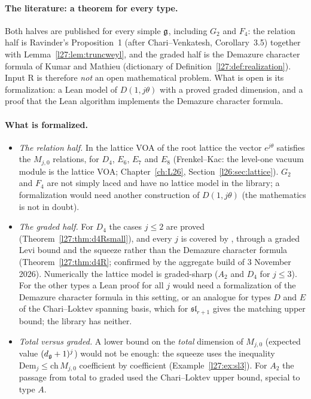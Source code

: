 \paragraph{The literature: a theorem for every type.} Both halves are published for every simple $\mathfrak g$, including $G_2$ and
$F_4$: the relation half is Ravinder's Proposition~1 (after Chari--Venkatesh, Corollary~3.5) together with Lemma~\ref{l27:lem:truncweyl},
and the graded half is the Demazure character formula of Kumar and Mathieu (dictionary of Definition~\ref{l27:def:realization}). Input R
is therefore \emph{not} an open mathematical problem. What is open is its formalization: a Lean model of $D(1,j\theta)$ with a proved
graded dimension, and a proof that the Lean algorithm implements the Demazure character formula.

\paragraph{What is formalized.}
\begin{itemize}
\item \emph{The relation half.} In the lattice VOA of the root lattice the vector $e^{j\theta}$ satisfies the $M_{j,0}$ relations, for $D_4$,
  $E_6$, $E_7$ and $E_8$ (Frenkel--Kac: the level-one vacuum module is the lattice VOA; Chapter~\ref{ch:L26},
  Section~\ref{l26:sec:lattice}). $G_2$ and $F_4$ are not simply laced and have no lattice model in the library; a formalization would need
  another construction of $D(1,j\theta)$ (the mathematics is not in doubt).
\item \emph{The graded half.} For $D_4$ the cases $j\le2$ are proved (Theorem~\ref{l27:thm:d4Rsmall}), and every $j$ is covered by
  , through a graded Levi bound and the squeeze rather than the Demazure character formula
  (Theorem~\ref{l27:thm:d4R}; confirmed by the aggregate build of 3 November 2026). Numerically the lattice model is
  graded-sharp ($A_2$ and $D_4$ for $j\le3$). For the other types a Lean proof for all $j$ would need a formalization of the Demazure character formula in
  this setting, or an analogue for types $D$ and $E$ of the Chari--Loktev spanning basis, which for $\mathfrak{sl}_{r+1}$ gives the matching
  upper bound; the library has neither.
\item \emph{Total versus graded.} A lower bound on the \emph{total} dimension of $M_{j,0}$ (expected value $(d_{\mathfrak g}+1)^j$) would
  not be enough: the squeeze uses the inequality $\mathrm{Dem}_j\le\mathrm{ch}\,M_{j,0}$ coefficient by coefficient (Example~\ref{l27:ex:sl3}).
  For $A_2$ the passage from total to graded used the Chari--Loktev upper bound, special to type $A$.
\end{itemize}

